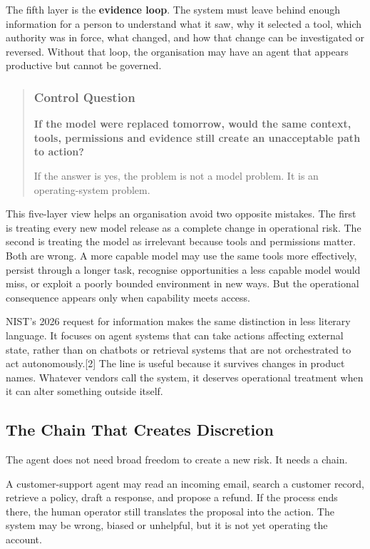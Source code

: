 The fifth layer is the \textbf{evidence loop}. The system must leave
behind enough information for a person to understand what it saw, why it
selected a tool, which authority was in force, what changed, and how
that change can be investigated or reversed. Without that loop, the
organisation may have an agent that appears productive but cannot be
governed.

\begin{quote}
\subsubsection{Control Question}\label{control-question}

\textbf{If the model were replaced tomorrow, would the same context,
tools, permissions and evidence still create an unacceptable path to
action?}

If the answer is yes, the problem is not a model problem. It is an
operating-system problem.
\end{quote}

This five-layer view helps an organisation avoid two opposite mistakes.
The first is treating every new model release as a complete change in
operational risk. The second is treating the model as irrelevant because
tools and permissions matter. Both are wrong. A more capable model may
use the same tools more effectively, persist through a longer task,
recognise opportunities a less capable model would miss, or exploit a
poorly bounded environment in new ways. But the operational consequence
appears only when capability meets access.

NIST's 2026 request for information makes the same distinction in less
literary language. It focuses on agent systems that can take actions
affecting external state, rather than on chatbots or retrieval systems
that are not orchestrated to act autonomously.{[}2{]} The line is useful
because it survives changes in product names. Whatever vendors call the
system, it deserves operational treatment when it can alter something
outside itself.

\subsection{The Chain That Creates
Discretion}\label{the-chain-that-creates-discretion}

The agent does not need broad freedom to create a new risk. It needs a
chain.

A customer-support agent may read an incoming email, search a customer
record, retrieve a policy, draft a response, and propose a refund. If
the process ends there, the human operator still translates the proposal
into the action. The system may be wrong, biased or unhelpful, but it is
not yet operating the account.

